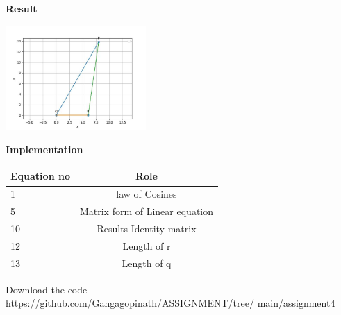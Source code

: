 \documentclass[10pt,a4paper]{article}
\begin{document}
\begin{multicols}{2}
\textbf{Result} 
\begin{center}
 \includegraphics[width=0.4\textwidth]{ex2.jpg}  
 \end{center}\vspace{5mm}
 \vspace{2mm}  
\textbf{Implementation}
\begin{center}
\setlength{\arrayrulewidth}{0.5mm}
\setlength{\tabcolsep}{5pt}
\renewcommand{\arraystretch}{3}
    \begin{tabular}{|l|c|}
    \hline 
    \textbf{Equation no} & \textbf{Role} \\ \hline
    1 &  law of Cosines \\ 
    5 & Matrix form of Linear equation  \\
    10 & Results Identity matrix  \\
    12 & Length of r\\
    13 & Length of q \\
    
    \hline
      \end{tabular}
  \end{center} \vspace{2mm}
  
 
\raggedright  Download the code \\
https://github.com/Gangagopinath/ASSIGNMENT/tree/
\newline
main/assignment4
  \end{multicols}
\end{document}
